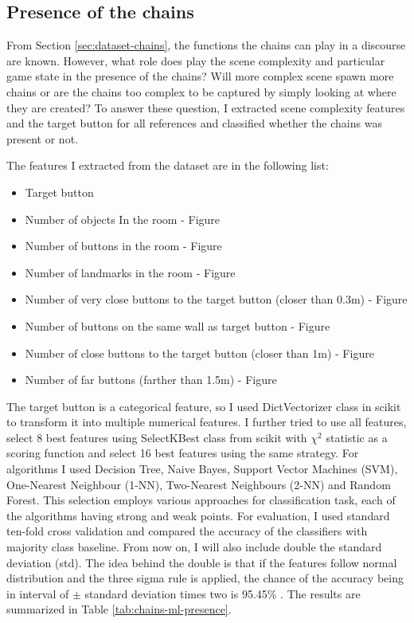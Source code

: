 \subsection{Presence of the chains}
From Section \ref{sec:dataset-chains}, the functions the chains can play in a discourse are known. However, what role does play the scene complexity and particular game state in the presence of the chains? Will more complex scene spawn more chains or are the chains too complex to be captured by simply looking at where they are created? To answer these question, I extracted scene complexity features and the target button for all references and classified whether the chains was present or not.

The features I extracted from the dataset are in the following list:

\begin{itemize}
\item
Target button	
\item
Number of objects In the room - Figure \label{fig:chains-distrib-objects}
\item
Number of buttons in the room - Figure \label{fig:chains-distrib-buttons}
\item
Number of landmarks in the room - Figure \label{fig:chains-distrib-landmarks}
\item
Number of very close buttons to the target button (closer than 0.3m) - Figure \label{fig:chains-distrib-veryclose}
\item
Number of buttons on the same wall as target button - Figure \label{fig:chains-distrib-samewall}
\item
Number of close buttons to the target button (closer than 1m) - Figure \label{fig:chains-distrib-close}
\item
Number of far buttons (farther than 1.5m) - Figure \label{fig:chains-distrib-far}
\end{itemize}

The target button is a categorical feature, so I used DictVectorizer class in scikit to transform it into multiple numerical features. I further tried to use all features, select 8 best features using SelectKBest class from scikit with $\chi^2$ statistic as a scoring function and select 16 best features using the same strategy. For algorithms I used Decision Tree, Naive Bayes, Support Vector Machines (SVM), One-Nearest Neighbour (1-NN), Two-Nearest Neighbours (2-NN) and Random Forest. This selection employs various approaches for classification task, each of the algorithms having strong and weak points. For evaluation, I used standard ten-fold cross validation and compared the accuracy of the classifiers with majority class baseline. From now on, I will also include double the standard deviation (std). The idea behind the double is that if the features follow normal distribution and the three sigma rule is applied, the chance of the accuracy being in interval of $\pm$ standard deviation times two is 95.45\% . The results are summarized in Table \ref{tab:chains-ml-presence}. 

